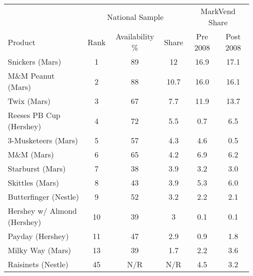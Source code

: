 \begin{tabular}{l c c c | c c}
\toprule
 & \multicolumn{3}{c|}{National Sample} & \multicolumn{2}{c}{MarkVend Share}\\
                    Product & Rank & Availability \% & Share & Pre 2008 & Post 2008 \\
\midrule
            Snickers (Mars) &    1 &             89 &    12 &     16.9 &      17.1 \\
          M\&M Peanut (Mars) &    2 &             88 &  10.7 &     16.0 &      16.1 \\
                Twix (Mars) &    3 &             67 &   7.7 &     11.9 &      13.7 \\
    Reeses PB Cup (Hershey) &    4 &             72 &   5.5 &      0.7 &       6.5 \\
        3-Musketeers (Mars) &    5 &             57 &   4.3 &      4.6 &       0.5 \\
                 M\&M (Mars) &    6 &             65 &   4.2 &      6.9 &       6.2 \\
           Starburst (Mars) &    7 &             38 &   3.9 &      3.2 &       3.0 \\
            Skittles (Mars) &    8 &             43 &   3.9 &      5.3 &       6.0 \\
      Butterfinger (Nestle) &    9 &             52 &   3.2 &      2.2 &       2.1 \\
Hershey w/ Almond (Hershey) &   10 &             39 &     3 &      0.1 &       0.1 \\
           Payday (Hershey) &   11 &             47 &   2.9 &      0.9 &       1.8 \\
           Milky Way (Mars) &   13 &             39 &   1.7 &      2.2 &       3.6 \\
         Raisinets (Nestle) &   45 &            N/R &   N/R &      4.5 &       3.2 \\
\bottomrule
\end{tabular}
